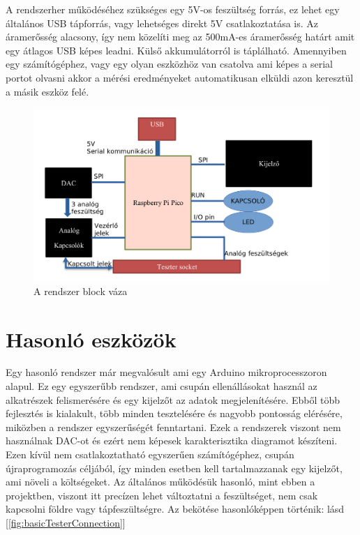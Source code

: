 A rendszerher működéséhez szükséges egy 5V-os feszültség forrás, ez lehet egy általános USB
tápforrás, vagy lehetséges direkt 5V csatlakoztatása is. Az áramerősség alacsony, így nem közelíti
meg az 500mA-es áramerősség határt amit egy átlagos USB képes leadni. Külső akkumulátorról
is táplálható. Amennyiben egy számítógéphez, vagy egy olyan eszközhöz van csatolva ami képes 
a serial portot olvasni akkor a mérési eredményeket automatikusan elküldi azon keresztül a 
másik eszköz felé. 


\begin{figure}[h]
    \centering
    \includegraphics[scale=0.3]{figures/images/literature/blockDiagramm.png}
    \caption{A rendszer block váza}
    \label{fig:blockDiagramm}
\end{figure}







\section{Hasonló eszközök}

Egy hasonló rendszer már megvalósult \cite{similarSystem} ami egy Arduino\cite{ArduinoAtmega} 
mikroprocesszoron alapul. Ez egy egyszerűbb rendszer, ami csupán ellenállásokat használ az 
alkatrészek felismerésére és egy kijelzőt az adatok megjelenítésére. Ebből több fejlesztés is 
kialakult, több minden tesztelésére és nagyobb pontosság elérésére, miközben a rendszer 
egyszerűségét fenntartani. Ezek a rendszerek viszont nem használnak DAC-ot és ezért nem képesek 
karakterisztika diagramot készíteni. Ezen kívül nem csatlakoztatható egyszerűen számítógéphez, 
csupán újraprogramozás céljából, így minden esetben kell tartalmazzanak egy kijelzőt, ami 
növeli a költségeket. Az általános működésük hasonló, mint ebben a projektben, viszont itt 
precízen lehet változtatni a feszültséget, nem csak kapcsolni földre vagy tápfeszültségre.
Az bekötése hasonlóképpen történik: lásd [\ref{fig:basicTesterConnection}]

